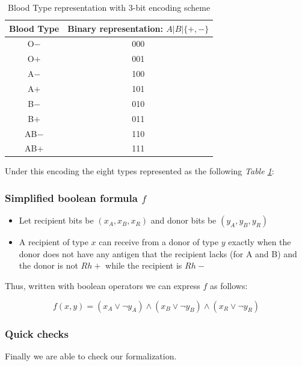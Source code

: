 \documentclass{article}
\begin{document}
\begin{center}
\begin{table}[!h]
\centering
\begin{tabular}{|c||c|}
\hline
\textbf{Blood Type} & \textbf{Binary representation: $A|B|\mathrm{\{+,-\}}$ } \\
\hline\hline 
O$-$ & 000  \\
O$+$ & 001  \\
A$-$ & 100 \\
A$+$ & 101 \\
B$-$ & 010 \\
B$+$ & 011  \\
AB$-$ & 110  \\
AB$+$ & 111 \\
\hline
\end{tabular}
\caption{Blood Type representation with 3-bit encoding scheme}
\label{tab:3bitreprz}
\end{table}
\end{center}

Under this encoding the eight types represented as the following \textit{Table \ref{tab:3bitreprz}}: 

\subsubsection*{Simplified boolean formula $f$}
\begin{itemize}
    \item Let recipient bits be $(x_A, x_B, x_R)$ and donor bits be $(y_A, y_B, y_R)$
    \item  A recipient of type $x$ can receive from a donor of type $y$ exactly when the donor does not have any antigen that the recipient lacks (for A and B) and the donor is not $Rh+$ while the recipient is $Rh-$
\end{itemize}
    
Thus, written with boolean operators we can express $f$ as follows:

\begin{equation}
    f(x,y) = (x_A \lor \neg y_A) \land (x_B \lor \neg y_B) \land (x_R \lor \neg y_R)
\end{equation}

\subsubsection*{Quick checks}

Finally we are able to check our formalization. 
\end{document}
